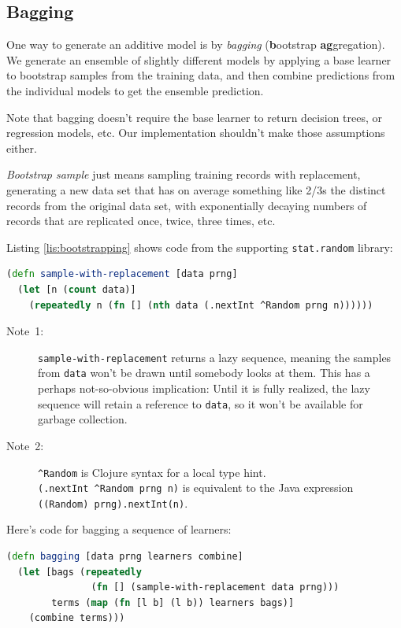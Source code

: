 \documentclass[11pt,openany,american,usenames,dvipsnames,svgnames,x11names,table,isodate]{article}
\numberwithin{equation}{section}
\numberwithin{figure}{section}
\begin{document}
\subsection{\label{sub:Bagging}Bagging}

One way to generate an additive model is by \emph{bagging} (\textbf{b}ootstrap
\textbf{ag}gregation). We generate an ensemble of slightly different
models by applying a base learner to bootstrap samples from the training
data, and then combine predictions from the individual models to get
the ensemble prediction.

Note that bagging doesn't require the base learner to return decision
trees, or regression models, etc. Our implementation shouldn't make
those assumptions either.

\emph{Bootstrap sample} just means sampling training records with
replacement, generating a new data set that has on average something
like 2/3s the distinct records from the original data set, with exponentially
decaying numbers of records that are replicated once, twice, three
times, etc. 

Listing \ref{lis:bootstrapping} shows code from the supporting
\texttt{stat.random} library:

\begin{minipage}[t]{1\columnwidth}%
\begin{lstlisting}[caption={Bootstrapping},label={lis:bootstrapping},language=clojure,tabsize=2]
(defn sample-with-replacement [data prng]
  (let [n (count data)]
    (repeatedly n (fn [] (nth data (.nextInt ^Random prng n))))))
\end{lstlisting}
%
\end{minipage}
\begin{description}
\item [{Note~1:}] \texttt{sample-with-replacement} returns a lazy sequence,
meaning the samples from \texttt{data} won't be drawn until somebody
looks at them. This has a perhaps not-so-obvious implication: Until
it is fully realized, the lazy sequence will retain a reference to
\texttt{data}, so it won't be available for garbage collection.
\item [{Note~2:}] \texttt{\textasciicircum{}Random} is Clojure syntax
for a local type hint. \texttt{(.nextInt~\textasciicircum{}Random~prng~n)}
is equivalent to the Java expression \texttt{((Random)~prng).nextInt(n)}. 
\end{description}
Here's code for bagging a sequence of learners:

\begin{lstlisting}[caption={Bagging},label={lis:bagging},language=clojure,tabsize=2]
(defn bagging [data prng learners combine]
  (let [bags (repeatedly 
               (fn [] (sample-with-replacement data prng)))
        terms (map (fn [l b] (l b)) learners bags)]
    (combine terms))) 
\end{lstlisting}
\end{document}
